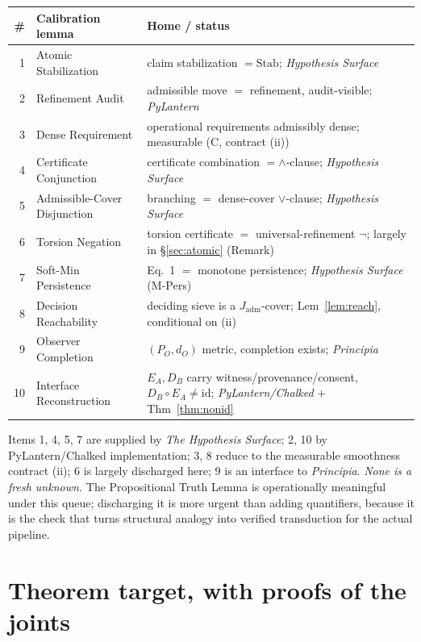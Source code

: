 \documentclass[11pt]{article}
\theoremstyle{definition}
\theoremstyle{remark}
\newcommand{\Stab}{\mathrm{Stab}}
\newcommand{\Jadm}{J_{\mathrm{adm}}}
\begin{document}
\begin{center}
\renewcommand{\arraystretch}{1.2}
\begin{tabular}{@{}r p{} p{}@{}}
\toprule
\# & \textbf{Calibration lemma} & \textbf{Home / status}\\
\midrule
1 & Atomic Stabilization & claim stabilization $=\Stab$; \emph{Hypothesis Surface}\\
2 & Refinement Audit & admissible move $=$ refinement, audit-visible; \emph{PyLantern}\\
3 & Dense Requirement & operational requirements admissibly dense; measurable (C, contract (ii))\\
4 & Certificate Conjunction & certificate combination $=\wedge$-clause; \emph{Hypothesis Surface}\\
5 & Admissible-Cover Disjunction & branching $=$ dense-cover $\vee$-clause; \emph{Hypothesis Surface}\\
6 & Torsion Negation & torsion certificate $=$ universal-refinement $\neg$; largely in \S\ref{sec:atomic} (Remark)\\
7 & Soft-Min Persistence & Eq.~1 $=$ monotone persistence; \emph{Hypothesis Surface} (M-Pers)\\
8 & Decision Reachability & deciding sieve is a $\Jadm$-cover; Lem~\ref{lem:reach}, conditional on (ii)\\
9 & Observer Completion & $(P_O,d_O)$ metric, completion exists; \emph{Principia}\\
10 & Interface Reconstruction & $E_A,D_B$ carry witness/provenance/consent, $D_B\!\circ\! E_A\neq\mathrm{id}$; \emph{PyLantern/Chalked} + Thm~\ref{thm:nonid}\\
\bottomrule
\end{tabular}
\end{center}

Items 1, 4, 5, 7 are supplied by \emph{The Hypothesis Surface}; 2, 10 by PyLantern/Chalked
implementation; 3, 8 reduce to the measurable smoothness contract (ii); 6 is largely discharged here;
9 is an interface to \emph{Principia}. \emph{None is a fresh unknown.} The Propositional Truth Lemma
is operationally meaningful under this queue; discharging it is more urgent than adding quantifiers,
because it is the check that turns structural analogy into verified transduction for the actual
pipeline.

\section{Theorem target, with proofs of the joints}
\end{document}
